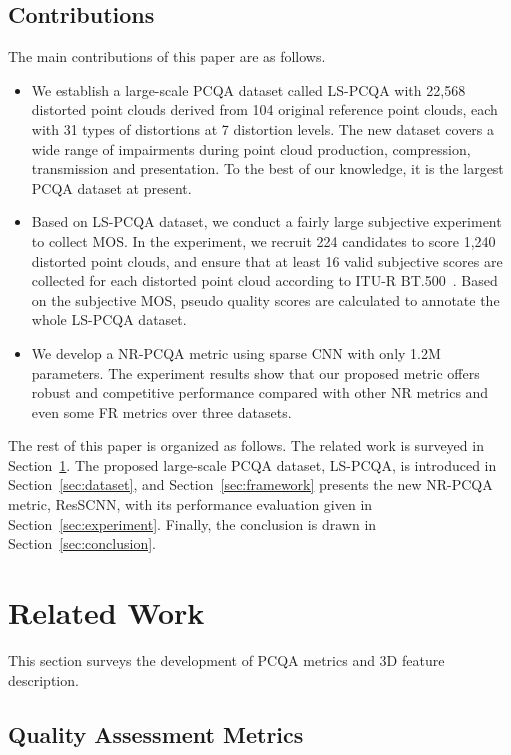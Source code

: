 \documentclass[acmsmall]{acmart}
\begin{document}
\subsection{Contributions}
\par The main contributions of this paper are as follows.
\begin{itemize}
\item We establish a large-scale PCQA dataset called LS-PCQA with 22,568 distorted point clouds derived from 104 original reference point clouds, each with 31 types of distortions at 7 distortion levels. The new dataset covers a wide range of impairments during point cloud production, compression, transmission and presentation. To the best of our knowledge, it is the largest PCQA dataset at present.
\item Based on LS-PCQA dataset, we conduct a fairly large subjective experiment to collect MOS. In the experiment, we recruit 224 candidates to score 1,240 distorted point clouds, and ensure that at least 16 valid subjective scores are collected for each distorted point cloud according to ITU-R BT.500~\cite{BT500}. Based on the subjective MOS, pseudo quality scores are calculated to annotate the whole LS-PCQA dataset.
\item We develop a NR-PCQA metric using sparse CNN with only 1.2M parameters. The experiment results show that our proposed metric offers robust and competitive performance compared with other NR metrics and even some FR metrics over three datasets.

  \end{itemize}
\par The rest of this paper is organized as follows. The related work is surveyed in Section~\ref{sec:related work}. The proposed large-scale PCQA dataset, LS-PCQA, is introduced in Section~\ref{sec:dataset}, and Section~\ref{sec:framework} presents the new NR-PCQA metric, ResSCNN, with its performance evaluation given in Section~\ref{sec:experiment}. Finally, the conclusion is drawn in Section~\ref{sec:conclusion}.

\section{Related Work}\label{sec:related work}

\par This section surveys the development of PCQA metrics and 3D feature description.

\subsection{Quality Assessment Metrics}
\end{document}
